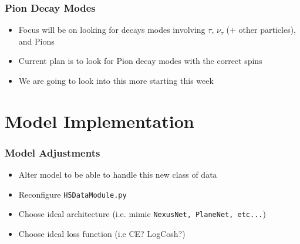 \documentclass{beamer}
\begin{document}
\begin{frame}
\frametitle{Pion Decay Modes}
	\begin{itemize}
		\item Focus will be on looking for decays modes involving $\tau$, $\nu_{\tau}$ (+ other particles), and Pions
		\item Current plan is to look for Pion decay modes with the correct spins
		\item We are going to look into this more starting this week
	\end{itemize}
\end{frame}




\section{Model Implementation}

\begin{frame}
\frametitle{Model Adjustments}
	\begin{itemize}
		\item Alter model to be able to handle this new class of data

		\item Reconfigure \texttt{H5DataModule.py}
		\item Choose ideal architecture (i.e. mimic \texttt{NexusNet, PlaneNet, etc...})
		\item Choose ideal loss function (i.e CE? LogCosh?)
	\end{itemize}
\end{frame}
\end{document}
